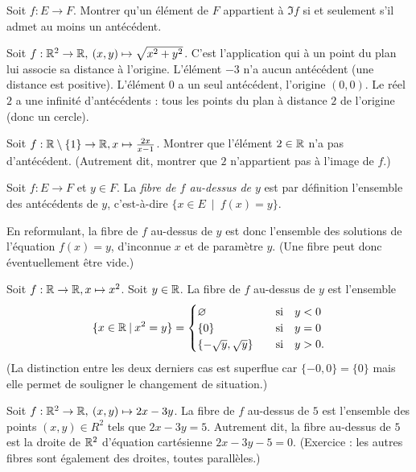 \begin{exercice}
Soit $f : E\to F$. Montrer qu'un élément de $F$ appartient à $\Im f$ si et seulement s'il admet au moins un antécédent.
\end{exercice}

\begin{exemple}
Soit $f : \mathbb{R}^2\to \mathbb{R},\: (x,y)\mapsto \sqrt{x^2+y^2}$. C'est l'application qui à un point du plan lui associe sa distance à l'origine. L'élément $-3$ n'a aucun antécédent (une distance est positive). L'élément $0$ a un seul antécédent, l'origine $(0,0)$. Le réel $2$ a une infinité d'antécédents : tous les points du plan à distance $2$ de l'origine (donc un cercle).
\end{exemple}

\begin{exercice}
Soit $f : \mathbb{R}\setminus \{1\} \to \mathbb{R}, x\mapsto \frac{2x}{x-1}$. Montrer que l'élément $2 \in \mathbb{R}$ n'a pas d'antécédent. (Autrement dit, montrer que $2$ n'appartient pas à l'image de $f$.)
\end{exercice}


\begin{definition}
Soit $f : E\to F$ et $y\in F$. La \emph{fibre de $f$ au-dessus de $y$} est par définition l'ensemble des antécédents de $y$, c'est-à-dire $\{x\in E \:\mid\: f(x)=y\}$.

En reformulant, la fibre de $f$ au-dessus de $y$ est donc l'ensemble des solutions de l'équation $f(x)=y$, d'inconnue $x$ et de paramètre $y$. (Une fibre peut donc éventuellement être vide.)
\end{definition}

\begin{exemple}
Soit $f : \mathbb{R}\to \mathbb{R}, x\mapsto x^2$. Soit $y\in \mathbb{R}$. La fibre de $f$ au-dessus de $y$ est l'ensemble 
\[
\{x\in \mathbb{R}\:|\: x^2=y\} = 
\begin{cases}
\varnothing &\quad\text{si}\quad y<0\\
\{0\} & \quad\text{si}\quad y=0\\
\{-\sqrt y, \sqrt y\}& \quad\text{si}\quad y>0.
\end{cases}
\]
(La distinction entre les deux derniers cas est superflue car $\{-0,0\}=\{0\}$ mais elle permet de souligner le changement de situation.)
\end{exemple}

\begin{exemple}
Soit $f : \mathbb{R}^2\to \mathbb{R},\: (x,y)\mapsto 2x-3y$. La fibre de $f$ au-dessus de $5$ est l'ensemble des points $(x,y) \in R^2$ tels que $2x-3y=5$. Autrement dit, la fibre au-dessus de $5$ est la droite de $\mathbb{R}^2$ d'équation cartésienne $2x-3y-5=0$. (Exercice : les autres fibres sont également des droites, toutes parallèles.)
\end{exemple}


